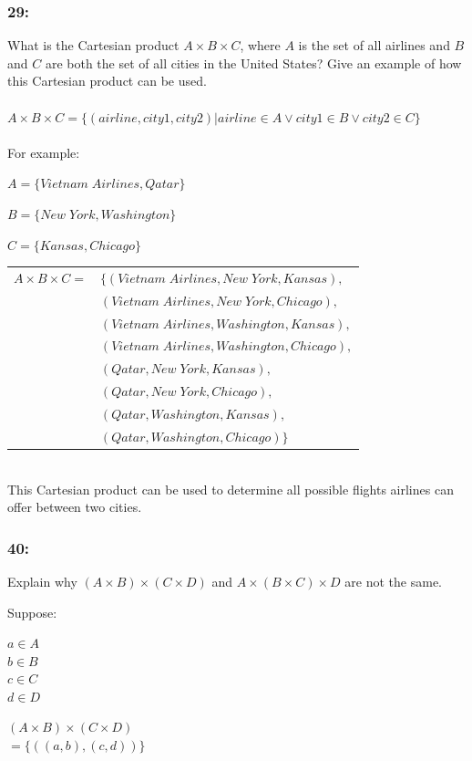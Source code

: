 \documentclass[12pt,en,a4paper]{article}
\begin{document}
	\subsubsection*{29:}
	What is the Cartesian product $A\times B\times C$, where $A$ is the set of all airlines and $B$ and $C$ are both the set of all cities in the United States? Give an example of how this Cartesian product can be used.\\\\
	$A\times B\times C=\{(airline,city1,city2)|airline\in A\vee city1\in B\vee city2\in C\}$\\\\
	For example:
	
	$A=\{Vietnam\; Airlines, Qatar\}$
	
	$B=\{New\; York, Washington\}$
	
	$C=\{Kansas, Chicago\}$\\
	\begin{tabular}{l l}
		$A\times B\times C=$ & $\{(Vietnam\;Airlines,New\;York,Kansas),$\\
		{} & $ (Vietnam\;Airlines,New\;York,Chicago),$\\
		{} & $(Vietnam\;Airlines,Washington,Kansas),$\\
		{} & $(Vietnam\;Airlines, Washington, Chicago),$\\
		{} & $(Qatar,New\;York,Kansas),$\\
		{} & $(Qatar,New\;York,Chicago),$\\
		{} & $(Qatar,Washington,Kansas),$\\
		{} & $(Qatar, Washington, Chicago)\}$
	\end{tabular}\\
	This Cartesian product can be used to determine all possible flights airlines can offer between two cities.
	\subsubsection*{40:}
	Explain why $(A\times B)\times(C\times D)$ and $A\times (B\times C)\times D$ are not the same.
	
	Suppose:
	\begin{center}
		$a\in A$\\
		$b\in B$\\
		$c\in C$\\
		$d\in D$
	\end{center}

	$(A\times B)\times(C\times D)$\\
	$=\{((a,b),(c,d))\}$
	
\end{document}

